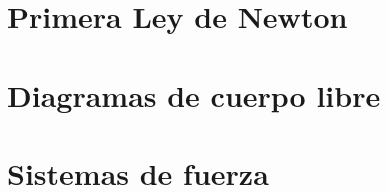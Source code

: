 


\section{Primera Ley de Newton}




\section{Diagramas de cuerpo libre}




\section{Sistemas de fuerza}


